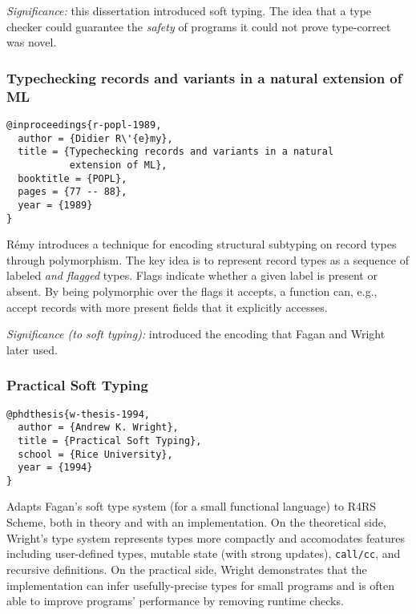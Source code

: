 \documentclass{article}
\begin{document}

\emph{Significance:} this dissertation introduced soft typing.
 The idea that a type checker could guarantee the \emph{safety} of programs
 it could not prove type-correct was novel.


\newpage
\subsubsection*{Typechecking records and variants in a natural extension of ML}
\begin{verbatim}
@inproceedings{r-popl-1989,
  author = {Didier R\'{e}my},
  title = {Typechecking records and variants in a natural
           extension of ML},
  booktitle = {POPL},
  pages = {77 -- 88},
  year = {1989}
}
\end{verbatim}

R\'{e}my introduces a technique for encoding structural subtyping on record
types through polymorphism.
The key idea is to represent record types as a sequence of labeled
\emph{and flagged} types.
Flags indicate whether a given label is present or absent.
By being polymorphic over the flags it accepts, a function can, e.g., accept
records with more present fields that it explicitly accesses.


\emph{Significance (to soft typing):} introduced the encoding that Fagan
and Wright later used.


\newpage
\subsubsection*{Practical Soft Typing}
\begin{verbatim}
@phdthesis{w-thesis-1994,
  author = {Andrew K. Wright},
  title = {Practical Soft Typing},
  school = {Rice University},
  year = {1994}
}
\end{verbatim}

Adapts Fagan's soft type system (for a small functional language) to R4RS
Scheme, both in theory and with an implementation.
On the theoretical side, Wright's type system represents types more compactly
and accomodates features including user-defined types, mutable state (with
strong updates), {\tt call/cc}, and recursive definitions.
On the practical side, Wright demonstrates that the implementation can
infer usefully-precise types for small programs and is often able to improve
programs' performance by removing runtime checks.
\end{document}
